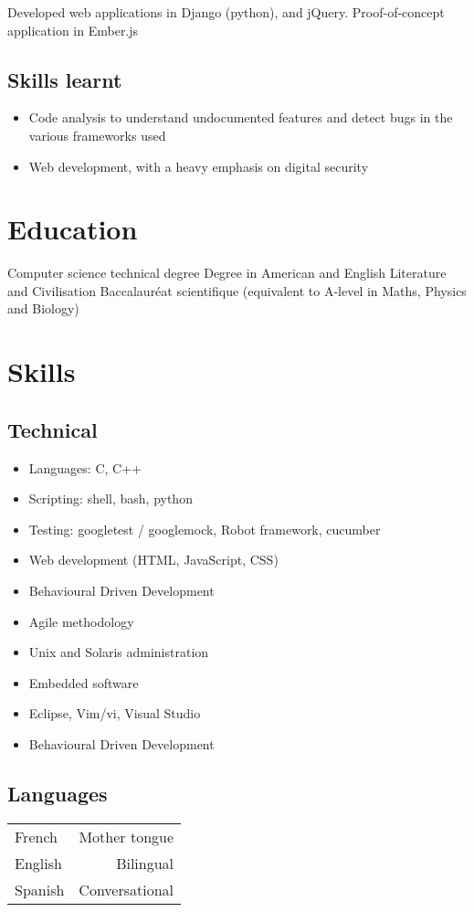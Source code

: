 \documentclass{cv}
\begin{document}
{Developed web applications in Django (python), and jQuery. Proof-of-concept application in Ember.js}
\subsection{Skills learnt}
\begin{itemize}
    \item {Code analysis to understand undocumented features and detect bugs in the various frameworks used}
    \item {Web development, with a heavy emphasis on digital security}
\end{itemize}

\pagebreak
\section{Education}
{Computer science technical degree}
{Degree in American and English Literature and Civilisation}
{Baccalauréat scientifique (equivalent to A-level in Maths, Physics and Biology)}
 \section{Skills}

\subsection{Technical}
\begin{itemize}
    \item {Languages: C, C++}
    \item {Scripting: shell, bash, python}
    \item {Testing: googletest / googlemock, Robot framework, cucumber}
    \item {Web development (HTML, JavaScript, CSS)}
    \item {Behavioural Driven Development}
    \item {Agile methodology}
    \item {Unix and Solaris administration}
    \item {Embedded software}
    \item {Eclipse, Vim/vi, Visual Studio}
    \item {Behavioural Driven Development}
\end{itemize}

\subsection{Languages}
\begin{tabular}{L!{\VRule}R}
French&Mother tongue\\
English&Bilingual\\
Spanish&Conversational\\
\end{tabular}
\end{document}
